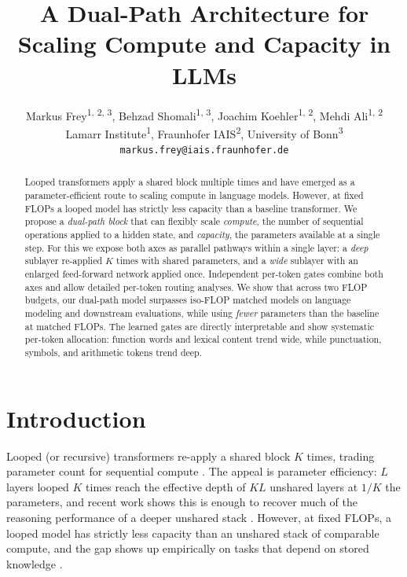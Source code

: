 \documentclass[11pt]{article}
\title{A Dual-Path Architecture for Scaling Compute and Capacity in LLMs}
\author{Markus Frey\textsuperscript{1, 2, 3}, 
Behzad Shomali\textsuperscript{1, 3}, 
Joachim Koehler\textsuperscript{1, 2},
Mehdi Ali\textsuperscript{1, 2}
\\
Lamarr Institute\textsuperscript{1}, Fraunhofer IAIS\textsuperscript{2}, University of Bonn\textsuperscript{3}
\\
\small \texttt{markus.frey@iais.fraunhofer.de} 
}
\begin{document}
\maketitle
\begin{abstract}
Looped transformers apply a shared block multiple times and have emerged as a parameter-efficient route to scaling compute in language models. However, at fixed FLOPs a looped model has strictly less capacity than a baseline transformer. We propose a \emph{dual-path
block} that can flexibly scale \emph{compute}, the number of sequential operations applied to a hidden state, and \emph{capacity}, the parameters available at a single step. For this we expose both axes as parallel pathways within a single layer: a \emph{deep} sublayer re-applied $K$ times with shared parameters, and a \emph{wide} sublayer with an enlarged feed-forward network applied once. Independent per-token gates combine both axes and allow detailed per-token routing analyses. We show that across two FLOP budgets, our dual-path model surpasses iso-FLOP matched models on language modeling and downstream evaluations, while using \emph{fewer} parameters than the baseline at matched FLOPs. The learned gates are directly interpretable and show systematic per-token allocation: function words and lexical content trend wide, while punctuation, symbols, and arithmetic tokens trend deep.
\end{abstract}
 
\section{Introduction}
\label{sec:intro}

Looped (or recursive) transformers re-apply a shared block $K$
times, trading parameter count for sequential compute
\citep{dehghani-etal-2019-ut, geiping-etal-2025-recurrent, saunshi-etal-2025-looped, zhu2025scaling}. The appeal is parameter efficiency:
$L$ layers looped $K$ times reach the effective depth of $KL$
unshared layers at $1/K$ the parameters, and recent work shows
this is enough to recover much of the reasoning performance of
a deeper unshared stack \citep{saunshi-etal-2025-looped, zhu2025scaling}. However, at fixed FLOPs, a looped model has strictly
less capacity than an unshared stack of comparable compute,
and the gap shows up empirically on tasks that depend on
stored knowledge \citep{frey-etal-2026-adaptive, zhu2025scaling}.
\end{document}
